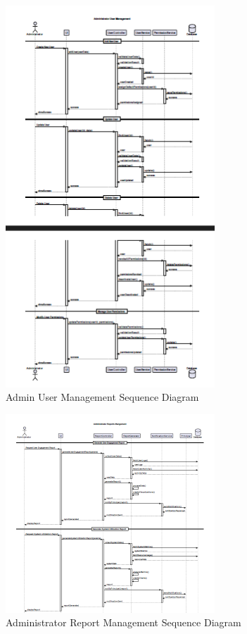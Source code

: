 \documentclass[12pt,a4paper]{report}
\begin{document}
\begin{figure}[htbp]
    \centering
    \includegraphics[width=0.7\textwidth]{admin-user-managment-sequence.png}
    \caption{Admin User Management Sequence Diagram}
    \label{fig:admin-user-management-sequence}
\end{figure}

\begin{figure}[htbp]
    \centering
    \includegraphics[width=0.7\textwidth]{administrator-report-management-sequence.png}
    \caption{Administrator Report Management Sequence Diagram}
    \label{fig:administrator-report-management-sequence}
\end{figure}
\end{document}
